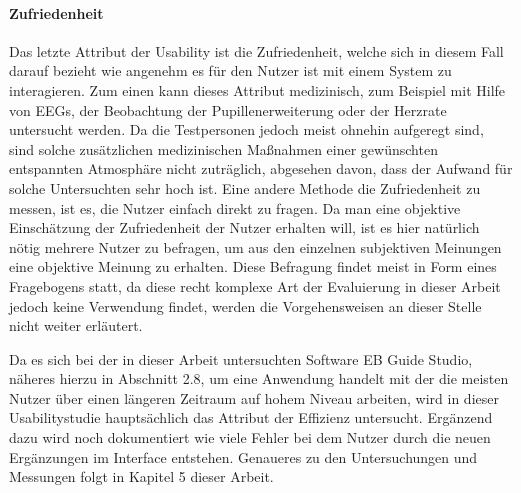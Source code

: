 \paragraph{Zufriedenheit}
Das letzte Attribut der Usability ist die Zufriedenheit, welche sich in diesem Fall darauf bezieht wie angenehm es für den Nutzer ist mit einem System zu interagieren.
Zum einen kann dieses Attribut medizinisch, zum Beispiel mit Hilfe von EEGs, der Beobachtung der Pupillenerweiterung oder der Herzrate untersucht werden.
Da die Testpersonen jedoch meist ohnehin aufgeregt sind, sind solche zusätzlichen medizinischen Maßnahmen einer gewünschten entspannten Atmosphäre nicht zuträglich, abgesehen davon, dass der Aufwand für solche Untersuchten sehr hoch ist.
Eine andere Methode die Zufriedenheit zu messen, ist es, die Nutzer einfach direkt zu fragen.
Da man eine objektive Einschätzung der Zufriedenheit der Nutzer erhalten will, ist es hier natürlich nötig mehrere Nutzer zu befragen, um aus den einzelnen subjektiven Meinungen eine objektive Meinung zu erhalten\cite{Nielsen.1995?}.
Diese Befragung findet meist in Form eines Fragebogens statt, da diese recht komplexe Art der Evaluierung in dieser Arbeit jedoch keine Verwendung findet, werden die Vorgehensweisen an dieser Stelle nicht weiter erläutert.

Da es sich bei der in dieser Arbeit untersuchten Software EB Guide Studio, näheres hierzu in Abschnitt 2.8, um eine Anwendung handelt mit der die meisten Nutzer über einen längeren Zeitraum auf hohem Niveau arbeiten, wird in dieser Usabilitystudie hauptsächlich das Attribut der Effizienz untersucht. Ergänzend dazu wird noch dokumentiert wie viele Fehler bei dem Nutzer durch die neuen Ergänzungen im Interface entstehen. Genaueres zu den Untersuchungen und Messungen folgt in Kapitel 5 dieser Arbeit.


